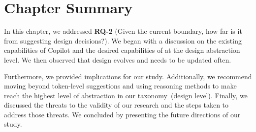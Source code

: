 \section{Chapter Summary}
In this chapter, we addressed \textbf{RQ-2} (Given the current boundary, how far is it from suggesting design decisions?). We began with a discussion on the existing capabilities of Copilot and the desired capabilities of \cct{} at the design abstraction level. We then observed that design evolves and \cct{} needs to be updated often.

Furthermore, we provided implications for our study. Additionally, we recommend moving beyond token-level suggestions and using reasoning methods to make \cct{} reach the highest level of abstraction in our taxonomy~(design level).
Finally, we discussed the threats to the validity of our research and the steps taken to address those threats. We concluded by presenting the future directions of our study. 